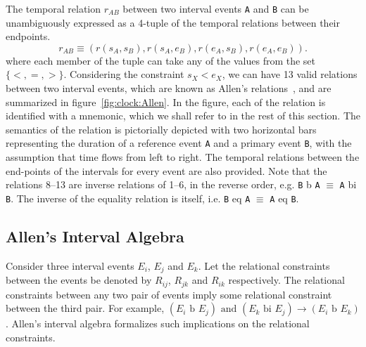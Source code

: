 The temporal relation $r_{AB}$ between two interval events \texttt{A} and \texttt{B} can be unambiguously expressed as a 4-tuple of  
the temporal relations between their endpoints. 
\begin{equation}
	r_{AB} \equiv ( r(s_A, s_B), r(s_A, e_B), r(e_A, s_B), r(e_A, e_B) ). 
\end{equation}
where each member of the tuple can take any of the values from the set $\{<,=,>\}$. 
Considering the constraint $s_X < e_X$, we can have 13 valid relations between two interval events, which are known as Allen's 
relations~\cite{Allen:1983}, and are summarized in figure~\ref{fig:clock:Allen}. 
%
In the figure, each of the relation is identified with a mnemonic, which we shall refer to in the rest of this section. The semantics 
of the relation is pictorially depicted with two horizontal bars representing the duration of a reference event \texttt{A} and 
a primary event \texttt{B}, with the assumption that time flows from left to right. The temporal relations between the end-points 
of the intervals for every event are also provided. 
Note that the relations 8--13 are inverse relations of 1--6, in the reverse order, e.g. 
\texttt{B} b \texttt{A} $\equiv$ \texttt{A} bi \texttt{B}. The inverse of the equality relation is itself, i.e. 
\texttt{B} eq \texttt{A} $\equiv$ \texttt{A} eq \texttt{B}.

\subsection{Allen's Interval Algebra}
\label{sec:clock:Allen-algebra}

Consider three interval events $E_i$, $E_j$ and $E_k$. Let the relational constraints between the events be denoted
by $R_{ij}$, $R_{jk}$ and $R_{ik}$ respectively.  The relational constraints between any two pair of events imply some relational 
constraint between the third pair. For example, 
$(E_i \text{ b } E_j) \text{ and } (E_k \text{ bi } E_j) \rightarrow (E_i \text{ b } E_k)$.
Allen's interval algebra formalizes such implications on the relational constraints.
 
